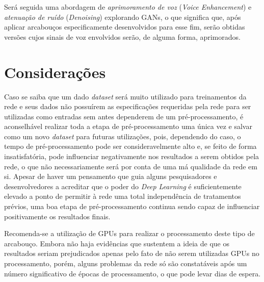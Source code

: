 Será seguida uma abordagem de \textit{aprimoramento de voz}  (\textit{Voice Enhancement}) e \textit{atenuação de ruído} (\textit{Denoising}) explorando GANs, o que significa que, após aplicar arcabouços especificamente desenvolvidos para esse fim, serão obtidas versões cujos sinais de voz envolvidos serão, de alguma forma, aprimorados.





\section{Considerações}
\label{sec:gan_for_bss_considerations}

Caso se saiba que um dado \textit{dataset} será muito utilizado para treinamentos da rede e seus dados não possuírem as especificações requeridas pela rede para ser utilizadas como entradas sem antes dependerem de um pré-processamento, é aconselhável realizar toda a etapa de pré-processamento uma única vez e salvar como um novo \textit{dataset} para futuras utilizações, pois, dependendo do caso, o tempo de pré-processamento pode ser consideravelmente alto e, se feito de forma insatisfatória, pode influenciar negativamente nos resultados a serem obtidos pela rede, o que não necessariamente será por conta de uma má qualidade da rede em si. Apesar de haver um pensamento que guia alguns pesquisadores e desenvolvedores a acreditar que o poder do \textit{Deep Learning} é suficientemente elevado a ponto de permitir à rede uma total independência de tratamentos prévios, uma boa etapa de pré-processamento continua sendo capaz de influenciar positivamente os resultados finais.

Recomenda-se a utilização de GPUs para realizar o processamento deste tipo de arcabouço. Embora não haja evidências que sustentem a ideia de que os resultados seriam prejudicados apenas pelo fato de não serem utilizadas GPUs no processamento, porém, alguns problemas da rede só são constatáveis após um número significativo de épocas de processamento, o que pode levar dias de espera.